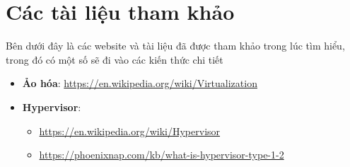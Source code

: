 \documentclass[a4paper,12pt]{article}
\begin{document}
\section{Các tài liệu tham khảo}
Bên dưới đây là các website và tài liệu đã được tham khảo trong lúc tìm hiểu, trong đó có một số sẽ đi vào các kiến thức chi tiết 

\begin{itemize}
    \item \textbf{Ảo hóa}: \href{https://en.wikipedia.org/wiki/Virtualization}{https://en.wikipedia.org/wiki/Virtualization}
    \item \textbf{Hypervisor}:
    \begin{itemize}

    
\item \href{https://en.wikipedia.org/wiki/Hypervisor}{https://en.wikipedia.org/wiki/Hypervisor}
\item \href{https://phoenixnap.com/kb/what-is-hypervisor-type-1-2}{https://phoenixnap.com/kb/what-is-hypervisor-type-1-2}

\end{itemize}
    

\end{itemize}
\end{document}
